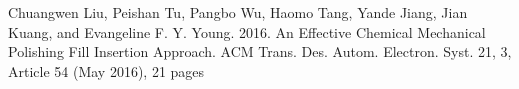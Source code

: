 \begin{pubentry}
  \item[] Chuangwen Liu, Peishan Tu, Pangbo Wu, Haomo Tang, Yande Jiang, Jian Kuang, and Evangeline F. Y. Young. 2016. An Effective Chemical Mechanical Polishing Fill Insertion Approach. ACM Trans. Des. Autom. Electron. Syst. 21, 3, Article 54 (May 2016), 21 pages
\end{pubentry}
